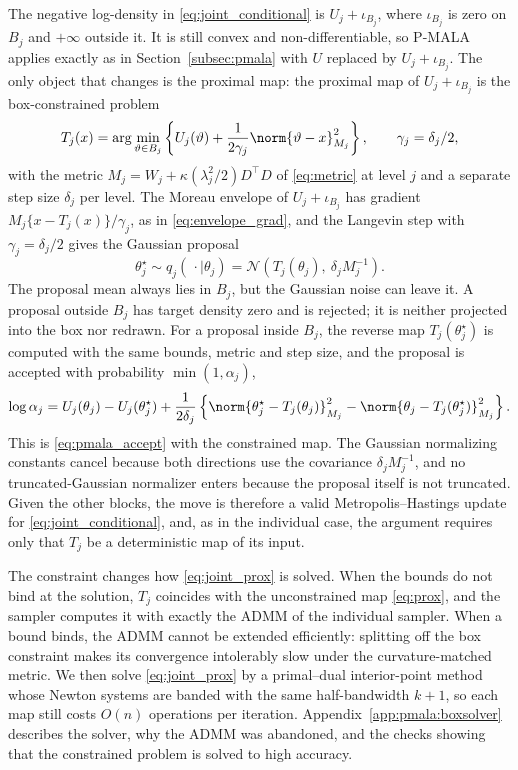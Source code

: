 The negative log-density in \eqref{eq:joint_conditional} is $U_j + \iota_{B_j}$, where $\iota_{B_j}$ is zero on $B_j$ and $+\infty$ outside it. It is still convex and non-differentiable, so P-MALA applies exactly as in Section~\ref{subsec:pmala} with $U$ replaced by $U_j + \iota_{B_j}$. The only object that changes is the proximal map: the proximal map of $U_j + \iota_{B_j}$ is the box-constrained problem
\begin{equation}
    T_j(x) = \arg\min_{\vartheta\in B_j}
             \left\{U_j(\vartheta)+\frac{1}{2\gamma_j}\norm{\vartheta-x}_{M_j}^2\right\},
             \qquad \gamma_j=\delta_j/2,
    \label{eq:joint_prox}
\end{equation}
with the metric $M_j = W_j + \kappa (\lambda_j^2/2) D^\top D$ of \eqref{eq:metric} at level $j$ and a separate step size $\delta_j$ per level. The Moreau envelope of $U_j + \iota_{B_j}$ has gradient $M_j\{x - T_j(x)\}/\gamma_j$, as in \eqref{eq:envelope_grad}, and the Langevin step with $\gamma_j = \delta_j/2$ gives the Gaussian proposal
\begin{equation}
    \theta_j^\star \sim q_j(\,\cdot\mid\theta_j) = \mathcal N\!\left(T_j(\theta_j),\ \delta_jM_j^{-1}\right).
    \label{eq:joint_proposal}
\end{equation}
The proposal mean always lies in $B_j$, but the Gaussian noise can leave it. A proposal outside $B_j$ has target density zero and is rejected; it is neither projected into the box nor redrawn. For a proposal inside $B_j$, the reverse map $T_j(\theta_j^\star)$ is computed with the same bounds, metric and step size, and the proposal is accepted with probability $\min(1,\alpha_j)$,
\begin{equation}
    \log\alpha_j = U_j(\theta_j)-U_j(\theta_j^\star)
    +\frac{1}{2\delta_j}\left\{\norm{\theta_j^\star-T_j(\theta_j)}_{M_j}^2
            -\norm{\theta_j-T_j(\theta_j^\star)}_{M_j}^2\right\}.
    \label{eq:joint_accept}
\end{equation}
This is \eqref{eq:pmala_accept} with the constrained map. The Gaussian normalizing constants cancel because both directions use the covariance $\delta_j M_j^{-1}$, and no truncated-Gaussian normalizer enters because the proposal itself is not truncated. Given the other blocks, the move is therefore a valid Metropolis--Hastings update for \eqref{eq:joint_conditional}, and, as in the individual case, the argument requires only that $T_j$ be a deterministic map of its input.

The constraint changes how \eqref{eq:joint_prox} is solved. When the bounds do not bind at the solution, $T_j$ coincides with the unconstrained map \eqref{eq:prox}, and the sampler computes it with exactly the ADMM of the individual sampler. When a bound binds, the ADMM cannot be extended efficiently: splitting off the box constraint makes its convergence intolerably slow under the curvature-matched metric. We then solve \eqref{eq:joint_prox} by a primal--dual interior-point method whose Newton systems are banded with the same half-bandwidth $k+1$, so each map still costs $O(n)$ operations per iteration. Appendix~\ref{app:pmala:boxsolver} describes the solver, why the ADMM was abandoned, and the checks showing that the constrained problem is solved to high accuracy.

